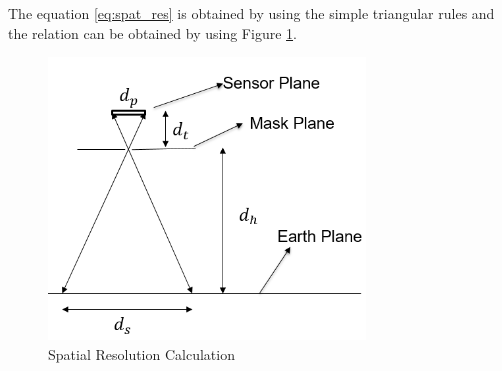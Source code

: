 The equation \ref{eq:spat_res} is obtained by using the simple triangular rules and the relation can be obtained by using Figure \ref{fig:spatial_resolution_calc}.
\begin{figure}[htb]
\centering
\includegraphics[width=0.75\textwidth]{pics/spatialRes}
\caption{Spatial Resolution Calculation}
\label{fig:spatial_resolution_calc}
\end{figure}


